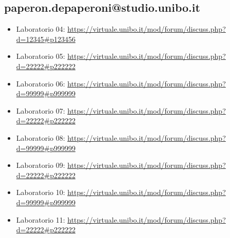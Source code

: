 \documentclass[a4paper,12pt]{report}
\begin{document}

\subsection{paperon.depaperoni@studio.unibo.it}

\begin{itemize}
 \item Laboratorio 04: \url{https://virtuale.unibo.it/mod/forum/discuss.php?d=12345#p123456}
 \item Laboratorio 05: \url{https://virtuale.unibo.it/mod/forum/discuss.php?d=22222#p222222}
 \item Laboratorio 06: \url{https://virtuale.unibo.it/mod/forum/discuss.php?d=99999#p999999}
 \item Laboratorio 07: \url{https://virtuale.unibo.it/mod/forum/discuss.php?d=22222#p222222}
 \item Laboratorio 08: \url{https://virtuale.unibo.it/mod/forum/discuss.php?d=99999#p999999}
 \item Laboratorio 09: \url{https://virtuale.unibo.it/mod/forum/discuss.php?d=22222#p222222}
 \item Laboratorio 10: \url{https://virtuale.unibo.it/mod/forum/discuss.php?d=99999#p999999}
 \item Laboratorio 11: \url{https://virtuale.unibo.it/mod/forum/discuss.php?d=22222#p222222}
\end{itemize}




\end{document}
